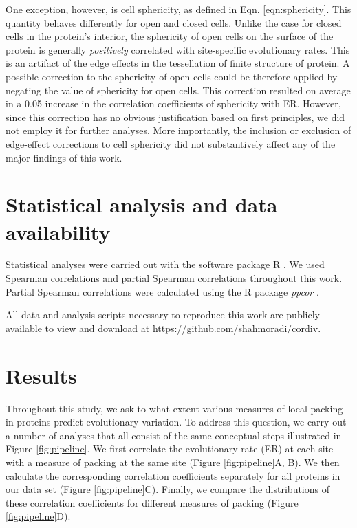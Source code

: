 \documentclass[12pt]{article}
\begin{document}
One exception, however, is cell sphericity, as defined in Eqn. \ref{eqn:sphericity}. This quantity behaves differently for open and closed cells. Unlike the case for closed cells in the protein's interior,  the sphericity of open cells on the surface of the protein is generally {\it positively} correlated with site-specific evolutionary rates. This is an artifact of the edge effects in the tessellation of finite structure of protein. A possible correction to the sphericity of open cells could be therefore applied by negating the value of sphericity for open cells. This correction resulted on average in a 0.05 increase in the correlation coefficients of sphericity with ER. However, since this correction has no obvious justification based on first principles, we did not employ it for further analyses. More importantly, the inclusion or exclusion of edge-effect corrections to cell sphericity did not substantively affect any of the major findings of this work.


\section*{Statistical analysis and data availability}

Statistical analyses were carried out with the software package R \cite{ihaka1998r}. We used Spearman correlations and partial Spearman correlations throughout this work. Partial Spearman correlations were calculated using the R package {\it ppcor} \cite{kim_understanding_2006}.

All data and analysis scripts necessary to reproduce this work are publicly available to view and download at \url{https://github.com/shahmoradi/cordiv}.


\section*{Results}

Throughout this study, we ask to what extent various measures of local packing in proteins predict evolutionary variation. To address this question, we carry out a number of analyses that all consist of the same conceptual steps illustrated in Figure \ref{fig:pipeline}. We first correlate the evolutionary rate (ER) at each site with a measure of packing at the same site (Figure \ref{fig:pipeline}A, B). We then calculate the corresponding correlation coefficients separately for all proteins in our data set (Figure \ref{fig:pipeline}C). Finally, we compare the distributions of these correlation coefficients for different measures of packing (Figure \ref{fig:pipeline}D).
\end{document}
